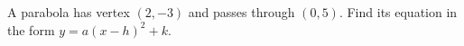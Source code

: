A parabola has vertex $(2,-3)$ and passes through $(0,5)$. Find its equation in the form $y=a(x-h)^2+k$.
